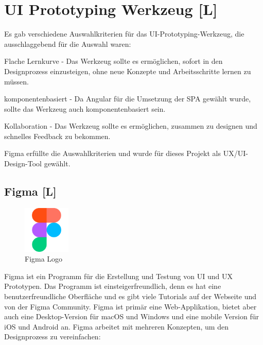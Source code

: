 \section{UI Prototyping Werkzeug [L]}
Es gab verschiedene Auswahlkriterien für das UI-Prototyping-Werkzeug, die ausschlaggebend für die Auswahl waren:
\begin{compactitem}
  \item Flache Lernkurve - Das Werkzeug sollte es ermöglichen, sofort in den Designprozess einzusteigen, ohne neue Konzepte und Arbeitsschritte lernen zu müssen.
  \item komponentenbasiert - Da Angular für die Umsetzung der SPA gewählt wurde, sollte das Werkzeug auch komponentenbasiert sein.
  \item Kollaboration - Das Werkzeug sollte es ermöglichen, zusammen zu designen und schnelles Feedback zu bekommen.
\end{compactitem}

Figma erfüllte die Auswahlkriterien und wurde für dieses Projekt als UX/UI-Design-Tool gewählt.

\subsection{Figma [L]}
\label{ch::technologies::figma}

\begin{figure}
  \begin{center}
    \includegraphics[width=0.2\textwidth]{pics/figma_logo.png}
   \caption{Figma Logo}
  \end{center}
\end{figure}

Figma ist ein Programm für die Erstellung und Testung von UI und UX Prototypen. Das Programm ist einsteigerfreundlich, denn es hat eine benutzerfreundliche Oberfläche und es gibt viele Tutorials auf der Webseite und von der Figma Community. Figma ist primär eine Web-Applikation, bietet aber auch eine Desktop-Version für macOS und Windows und eine mobile Version für iOS und Android an. Figma arbeitet mit mehreren Konzepten, um den Designprozess zu vereinfachen:

